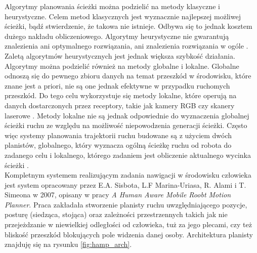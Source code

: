 Algorytmy planowania ścieżki można podzielić na metody klasyczne i heurystyczne. Celem metod klasycznych jest wyznacznie najlepszej możliwej ścieżki, bądź stwierdzenie, że takowa nie istnieje. Odbywa się to jednak kosztem dużego nakładu obliczeniowego. Algorytmy heurystyczne nie gwarantują znalezienia ani optymalnego rozwiązania, ani znalezienia rozwiązania w ogóle \cite{planer_1}. Zaletą algorytmów heurystycznych jest jednak większa szybkość działania. Algorytmy można podzielić również na metody globalne i lokalne. Globalne odnoszą się do pewnego zbioru danych na temat przeszkód w środowisku, które znane jest a priori, nie są one jednak efektywne w przypadku ruchomych przeszkód. Do tego celu wykorzystuje się metody lokalne, które operują na danych dostarczonych przez receptory, takie jak kamery RGB czy skanery laserowe \cite{taxonomy}\cite{planer_1}\cite{planer_2}. Metody lokalne nie są jednak odpowiednie do wyznaczenia globalnej ścieżki ruchu ze względu na możliwość niepowodzenia generacji ścieżki. Często więc systemy planowania trajektorii ruchu budowane są z użyciem dwóch planistów, globalnego, który wyznacza ogólną ścieżkę ruchu od robota do zadanego celu i lokalnego, którego zadaniem jest obliczenie aktualnego wycinka ścieżki \cite{taxonomy}. \\

Kompletnym systemem realizującym zadania nawigacji w środowisku człowieka jest system opracowany przez E.A. Sisbota, L.F Marina-Uriasa, R. Alami i T. Simeona w 2007, opisany w pracy {\textit{A Human Aware Mobile Roobt Motion Planner}}\cite{ma}. Praca zakładała stworzenie planisty ruchu uwzględniającego pozycje, posturę (siedząca, stojąca) oraz zależności przestrzennych takich jak nie przejeżdzanie w niewielkiej odległości od człowieka, tuż za jego plecami, czy też bliskość przeszkód blokujących pole widzenia danej osoby. Architektura planisty znajduję się na rysunku \ref{fig:hamp_arch}.


